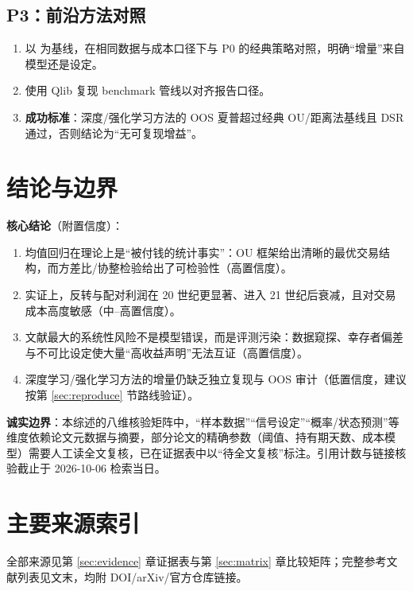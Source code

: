 \documentclass[11pt,a4paper]{ctexart}
\begin{document}
\subsection{P3：前沿方法对照}

\begin{enumerate}
  \item 以 \cite{arxiv_dl_sa,arxiv_rl_sa} 为基线，在相同数据与成本口径下与 P0 的经典策略对照，明确“增量”来自模型还是设定。
  \item 使用 Qlib \cite{qlib} 复现 benchmark 管线以对齐报告口径。
  \item \textbf{成功标准}：深度/强化学习方法的 OOS 夏普超过经典 OU/距离法基线且 DSR 通过，否则结论为“无可复现增益”。
\end{enumerate}

\section{结论与边界}\label{sec:conclusion}

\noindent\textbf{核心结论}（附置信度）：
\begin{enumerate}
  \item 均值回归在理论上是“被付钱的统计事实”：OU 框架给出清晰的最优交易结构，而方差比/协整检验给出了可检验性（高置信度）。
  \item 实证上，反转与配对利润在 20 世纪更显著、进入 21 世纪后衰减，且对交易成本高度敏感（中--高置信度）。
  \item 文献最大的系统性风险不是模型错误，而是评测污染：数据窥探、幸存者偏差与不可比设定使大量“高收益声明”无法互证（高置信度）。
  \item 深度学习/强化学习方法的增量仍缺乏独立复现与 OOS 审计（低置信度，建议按第 \ref{sec:reproduce} 节路线验证）。
\end{enumerate}

\noindent\textbf{诚实边界}：本综述的八维核验矩阵中，“样本数据”“信号设定”“概率/状态预测”等维度依赖论文元数据与摘要，部分论文的精确参数（阈值、持有期天数、成本模型）需要人工读全文复核，已在证据表中以“待全文复核”标注。引用计数与链接核验截止于 2026-10-06 检索当日。





\section*{主要来源索引}
\noindent 全部来源见第 \ref{sec:evidence} 章证据表与第 \ref{sec:matrix} 章比较矩阵；完整参考文献列表见文末，均附 DOI/arXiv/官方仓库链接。

\newpage

\end{document}
